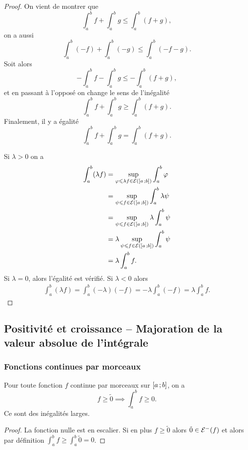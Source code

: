 \begin{proof}
On vient de montrer que
\begin{equation}
  \int_a^b f + \int_a^b g \leqslant \int_a^b (f+g),
\end{equation}
on a aussi
\begin{equation}
  \int_a^b (-f) + \int_a^b (-g) \leqslant \int_a^b (-f-g).
\end{equation}
Soit alors
\begin{equation}
  -\int_a^b f - \int_a^b g \leqslant -\int_a^b (f+g),
\end{equation}
et en passant à l'opposé on change le sens de l'inégalité
\begin{equation}
  \int_a^b f + \int_a^b g \geqslant \int_a^b (f+g).
\end{equation}
Finalement, il y a égalité 
\begin{equation}
  \int_a^b f + \int_a^b g = \int_a^b (f+g).
\end{equation}

Si \(\lambda>0\) on a
\begin{align}
  \int_a^b (\lambda f) &= \sup\limits_{\varphi \leqslant \lambda f \in \mathcal{E}(\left[ a \, ;  b \right])} \int_a^b \varphi \\
  &= \sup\limits_{\psi \leqslant f \in \mathcal{E}(\left[ a \, ;  b \right])} \int_a^b \lambda \psi \\
  &= \sup\limits_{\psi \leqslant f \in \mathcal{E}(\left[ a \, ;  b \right])} \lambda \int_a^b \psi \\
  &= \lambda \sup\limits_{\psi \leqslant f \in \mathcal{E}(\left[ a \, ;  b \right])} \int_a^b \psi \\
  &=\lambda \int_a^b f.
\end{align}
Si \(\lambda=0\), alors l'égalité est vérifié. Si \(\lambda<0\) alors
\begin{align}
  \int_a^b (\lambda f) = \int_a^b (-\lambda)(-f) = -\lambda \int_a^b(-f) = \lambda \int_a^b f.
\end{align}
\end{proof}

\subsection{Positivité et croissance -- Majoration de la valeur absolue de l'intégrale}

\subsubsection{Fonctions continues par morceaux}

\begin{theo}
  Pour toute fonction \(f\) continue par morceaux sur \(\left[ a \, ;  b \right]\), on a
  \begin{equation}
    f \geqslant \tilde{0} \implies \int_a^b f \geqslant 0.
  \end{equation}
  \danger Ce sont des inégalités larges.
\end{theo}
\begin{proof}
  La fonction nulle est en escalier. Si en plus \(f \geqslant \tilde{0}\) alors \(\tilde{0} \in \mathcal{E}^{-}(f)\) et alors par définition \(\int_a^b f \geqslant \int_a^b \tilde{0}=0\).
\end{proof}

